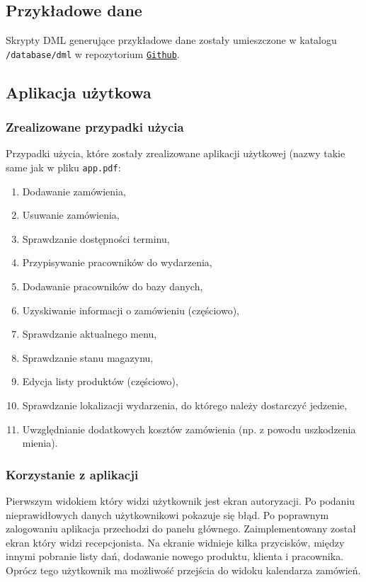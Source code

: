 \documentclass[12pt]{article}
\begin{document}
\subsection{Przykładowe dane}
Skrypty DML generujące przykładowe dane zostały umieszczone w katalogu \texttt{/database/dml} w repozytorium \texttt{\href{https://github.com/JMazurkiewicz/BD2-Catering/tree/master/database/dml}{Github}}.

\subsection{Aplikacja użytkowa}

\subsubsection{Zrealizowane przypadki użycia}
\noindent Przypadki użycia, które zostały zrealizowane aplikacji użytkowej (nazwy takie same jak w pliku \texttt{app.pdf}:
\begin{enumerate}
    \item Dodawanie zamówienia,
    \item Usuwanie zamówienia,
    \item Sprawdzanie dostępności terminu,
    \item Przypisywanie pracowników do wydarzenia,
    \item Dodawanie pracowników do bazy danych,
    \item Uzyskiwanie informacji o zamówieniu (częściowo),
    \item Sprawdzanie aktualnego menu,
    \item Sprawdzanie stanu magazynu,
    \item Edycja listy produktów (częściowo),
    \item Sprawdzanie lokalizacji wydarzenia, do którego należy dostarczyć jedzenie,
    \item Uwzględnianie dodatkowych kosztów zamówienia (np. z powodu uszkodzenia mienia).
\end{enumerate}

\subsubsection{Korzystanie z aplikacji}

Pierwszym widokiem który widzi użytkownik jest ekran autoryzacji. Po podaniu nieprawidłowych danych użytkownikowi pokazuje się błąd. Po poprawnym zalogowaniu aplikacja przechodzi do panelu głównego. Zaimplementowany został ekran który widzi recepcjonista. Na ekranie widnieje kilka przycisków, między innymi pobranie listy dań, dodawanie nowego produktu, klienta i pracownika. Oprócz tego użytkownik ma możliwość przejścia do widoku kalendarza zamówień.
\end{document}

